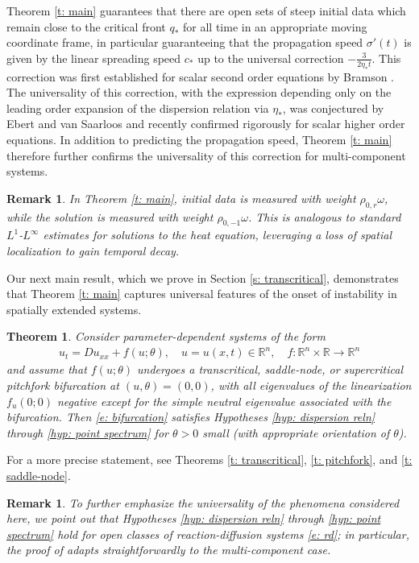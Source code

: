 \documentclass[11pt]{article}
\newcommand{\R}{\mathbb{R}}
\newtheorem{thm}{Theorem}
\newtheorem{remark}[prop]{Remark}
\numberwithin{equation}{section}
\numberwithin{prop}{section}
\begin{document}
Theorem \ref{t: main} guarantees that there are open sets of steep initial data which remain close to the critical front $q_*$  for all time in an appropriate moving coordinate frame, in particular guaranteeing that the propagation speed $\sigma'(t)$ is given by the linear spreading speed $c_*$ up to the universal correction $- \frac{3}{2 \eta_* t}$. This correction was first established for scalar second order equations by Bramson \cite{Bramson1, Bramson2}. The universality of this correction, with the expression depending only on the leading order expansion of the dispersion relation via $\eta_*$, was conjectured by Ebert and van Saarloos \cite{EbertvanSaarloos} and recently confirmed rigorously \cite{CAMS} for scalar higher order equations. In addition to predicting the propagation speed, Theorem \ref{t: main} therefore further confirms the universality of this correction for multi-component systems. 

\begin{remark}
	In Theorem \ref{t: main}, initial data is measured with weight $\rho_{0,r}\omega$, while the solution is measured with weight $\rho_{0,-1} \omega$. This is analogous to standard $L^1$-$L^\infty$ estimates for solutions to the heat equation, leveraging a loss of spatial localization to gain temporal decay. 
\end{remark}

Our next main result, which we prove in Section \ref{s: transcritical}, demonstrates that Theorem \ref{t: main} captures universal features of the onset of instability in spatially extended systems. 
\begin{thm}\label{t: bifurcations}
	Consider parameter-dependent systems of the form
	\begin{align}
	u_t = D u_{xx} + f(u; \theta), \quad u = u(x,t) \in \R^n, \quad f:\R^n \times \R \to \R^n \label{e: bifurcation}
	\end{align}
	and assume that $f(u; \theta)$ undergoes a transcritical, saddle-node, or supercritical pitchfork bifurcation at $(u, \theta) = (0, 0)$, with all eigenvalues of the linearization $f_u (0; 0)$ negative except for the simple neutral eigenvalue associated with the bifurcation. Then \eqref{e: bifurcation} satisfies Hypotheses \ref{hyp: dispersion reln} through \ref{hyp: point spectrum} for $\theta > 0$ small (with appropriate orientation of $\theta$). 
\end{thm}
For a more precise statement, see Theorems \ref{t: transcritical}, \ref{t: pitchfork}, and \ref{t: saddle-node}. 
\begin{remark}
	To further emphasize the universality of the phenomena considered here, we point out that Hypotheses \ref{hyp: dispersion reln} through \ref{hyp: point spectrum} hold for open classes of reaction-diffusion systems \eqref{e: rd}; in particular, the proof of \cite[Theorem 2]{CAMS} adapts straightforwardly to the multi-component case.  
\end{remark}
\end{document}
